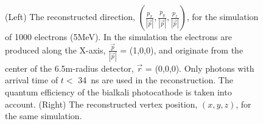 \documentclass[aps,prc,twocolumn,groupedaddress,showpacs,amsmath,amssymb,floatfix,superscriptaddress]{revtex4}
\begin{document}
\begin{figure}[tbh]
        \begin{center}
        \caption[]{\label{fig:reco} (Left) The reconstructed direction,
        $(\frac{p_x}{|\vec{p}|}, \frac{p_y}{|\vec{p}|},
        \frac{p_z}{|\vec{p}|})$, for the simulation of 1000 electrons
        (5MeV). In the simulation the electrons are produced along the
        X-axis, $\frac{\vec{p}}{|\vec{p}|}$ = (1,0,0), and originate
        from the center of the 6.5m-radius detector, $\vec{r}$ =
        (0,0,0). Only photons with arrival time of $t<$ 34~ns are used
        in the reconstruction. The quantum efficiency of the bialkali
        photocathode is taken into account. (Right) The reconstructed
        vertex position, $(x,y,z)$, for the same simulation.}

\end{center}
\end{figure}
\end{document}
